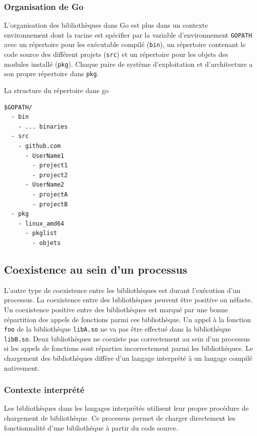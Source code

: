 \subsubsection{Organisation de Go}
L'organisation des bibliothèques dans Go est plus dans un
contexte environnement dont la racine est spécifier par la variable d'environnement \texttt{GOPATH}
avec un répertoire pour les exécutable compilé (\texttt{bin}),
un répertoire contenant le code source des différent projets (\texttt{src}) et un
répertoire pour les objets des modules installé (\texttt{pkg}). Chaque paire de système
d'exploitation et d'architecture a son propre répertoire dans \texttt{pkg}.

La structure du répertoire dans go
\begin{verbatim}
$GOPATH/
  - bin
    - ... binaries
  - src
    - github.com
      - UserName1
        - project1
        - project2
      - UserName2
        - projectA
        - projectB
  - pkg
    - linux_amd64
      - pkglist
        - objets
\end{verbatim}



\subsection{Coexistence au sein d'un processus}
L'autre type de coexistence entre les bibliothèques est durant l'exécution d'un
processus.  La coexistence entre des bibliothèques peuvent être positive ou
néfaste.  Un coexistence positive entre des bibliothèques est marqué par une
bonne répartition des appels de fonctions parmi ces bibliothèque.  Un appel à
la fonction \verb|foo| de la bibliothèque \verb|libA.so| ne va pas être
effectué dans la bibliothèque \verb|libB.so|. Deux bibliothèques ne coexiste
pas correctement au sein d'un processus si les appels de fonctions sont
réparties incorrectement parmi les bibliothèques. Le chargement des bibliothèques
diffère d'un langage interprété à un langage compilé nativement.

\subsubsection{Contexte interprété}
Les bibliothèques dans les langages interprétés utilisent leur propre procédure
de chargement de bibliothèque. Ce processus permet de charger directement les
fonctionnalité d'une bibliothèque à partir du code source.

